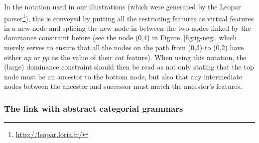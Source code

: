In the notation used in our illustrations (which were generated by the
Leopar parser\footnote{\url{http://leopar.loria.fr/}}), this is conveyed
by putting all the restricting features as virtual features in a new
node and splicing the new node in between the two nodes linked by the
dominance constraint before (see the node (0,4) in
Figure~\ref{fig:ig-neg}, which merely serves to ensure that all the
nodes on the path from (0,3) to (0,2) have either $np$ or $pp$ as the
value of their $cat$ feature). When using this notation, the (large)
dominance constraint should then be read as not only stating that the
top node must be an ancestor to the bottom node, but also that any
intermediate nodes between the ancestor and successor must match the
ancestor's features.

\subsubsection{The link with abstract categorial grammars}
\label{sssec:link-ig-acg}
